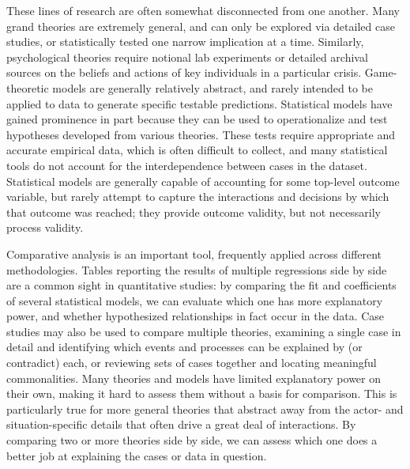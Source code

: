 These lines of research are often somewhat disconnected from one another. Many grand theories are extremely general, and can only be explored via detailed case studies, or statistically tested one narrow implication at a time. Similarly, psychological theories require notional lab experiments or detailed archival sources on the beliefs and actions of key individuals in a particular crisis. Game-theoretic models are generally relatively abstract, and rarely intended to be applied to data to generate specific testable predictions. Statistical models have gained prominence in part because they can be used to operationalize and test hypotheses developed from various theories. These tests require appropriate and accurate empirical data, which is often difficult to collect, and many statistical tools do not account for the interdependence between cases in the dataset. Statistical models are generally capable of accounting for some top-level outcome variable, but rarely attempt to capture the interactions and decisions by which that outcome was reached; they provide outcome validity, but not necessarily process validity. 

Comparative analysis is an important tool, frequently applied across different methodologies. Tables reporting the results of multiple regressions side by side are a common sight in quantitative studies: by comparing the fit and coefficients of several statistical models, we can evaluate which one has more explanatory power, and whether hypothesized relationships in fact occur in the data. Case studies may also be used to compare multiple theories, examining a single case in detail and identifying which events and processes can be explained by (or contradict) each, or reviewing sets of cases together and locating meaningful commonalities. Many theories and models have limited explanatory power on their own, making it hard to assess them without a basis for comparison. This is particularly true for more general theories that abstract away from the actor- and situation-specific details that often drive a great deal of interactions. By comparing two or more theories side by side, we can assess which one does a better job at explaining the cases or data in question.

